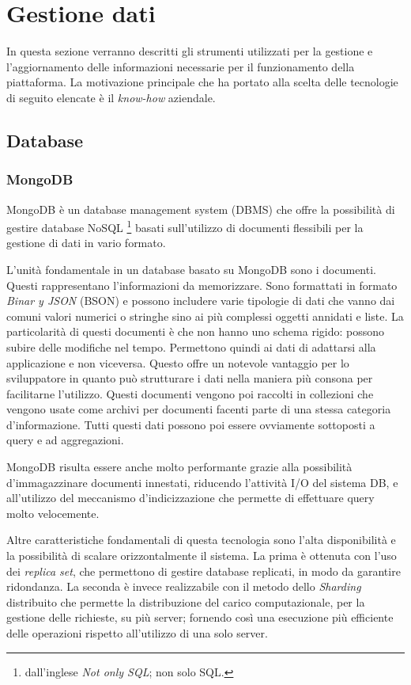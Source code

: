\section{Gestione dati}
In questa sezione verranno descritti gli strumenti utilizzati per la gestione e l'aggiornamento delle informazioni
necessarie per il funzionamento della piattaforma.
La motivazione principale che ha portato alla scelta delle tecnologie di seguito elencate è il \textit{know-how} aziendale.

\subsection{Database}
\subsubsection{MongoDB}
MongoDB\cite{MongoDB} è un database management system (DBMS) che offre la possibilità di gestire database NoSQL
\footnote{
    dall'inglese \textit{Not only SQL}; non solo SQL.
} basati sull'utilizzo di documenti flessibili per la gestione di dati in vario formato.\cite{IBM-MongoDB}

L'unità fondamentale in un database basato su MongoDB sono i documenti. Questi rappresentano l'informazioni da memorizzare.
Sono formattati in formato \textit{Binar y JSON} (BSON) e possono includere varie tipologie di dati che vanno dai comuni
valori numerici o stringhe sino ai più complessi oggetti annidati e liste.
La particolarità di questi documenti è che non hanno uno schema rigido: possono subire delle modifiche nel tempo. Permettono quindi
ai dati di adattarsi alla applicazione e non viceversa. Questo offre un notevole vantaggio per lo sviluppatore
in quanto può strutturare i dati nella maniera più consona per facilitarne l'utilizzo.
Questi documenti vengono poi raccolti in collezioni che vengono usate come archivi per documenti facenti parte di una stessa categoria d'informazione.
Tutti questi dati possono poi essere ovviamente sottoposti a query e ad aggregazioni.

MongoDB risulta essere anche molto performante grazie alla possibilità d'immagazzinare documenti innestati, riducendo l'attività I/O del sistema DB,
e all'utilizzo del meccanismo d'indicizzazione che permette di effettuare query molto velocemente.

Altre caratteristiche fondamentali di questa tecnologia sono l'alta disponibilità e la possibilità di scalare orizzontalmente il sistema.
La prima è ottenuta con l'uso dei \textit{replica set}, che permettono di gestire database replicati, in modo da garantire ridondanza.
La seconda è invece realizzabile con il metodo dello \textit{Sharding} distribuito che permette
la distribuzione del carico computazionale, per la gestione delle richieste, su più server; fornendo così una esecuzione più efficiente delle operazioni rispetto all'utilizzo di una solo server.



